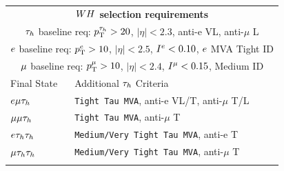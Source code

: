 \begin{table}[htbp]
\centering
\begin{small}
\begin{tabular}{ll}
     \multicolumn{2}{c}{ \textbf{$WH$ selection requirements} }                \\ 
     \multicolumn{2}{c}{$\tau_{h}$ baseline req: $p_\mathrm{T}^{\tau_{h}}>20$, $|\eta|<2.3$, anti-e VL, anti-$\mu$ L}    \\
     \multicolumn{2}{c}{$e$ baseline req: $p_\mathrm{T}^{e}>10$, $|\eta|<2.5$, $I^{e}<0.10$, $e$ MVA Tight ID}                 \\ 
     \multicolumn{2}{c}{$\mu$ baseline req: $p_\mathrm{T}^{\mu}>10$, $|\eta|<2.4$, $I^{\mu}<0.15$, Medium ID}          \\
\hline
  Final State            &      Additional $\tau_{h}$ Criteria  \\
\hline
 $e\mu\tau_{h}$      &   \texttt{Tight Tau MVA}, anti-e VL/T, anti-$\mu$ T/L             \\
 $\mu\mu\tau_{h}$     &   \texttt{Tight Tau MVA}, anti-$\mu$ T             \\
 $e\tau_{h}\tau_{h}$     &   \texttt{Medium/Very Tight Tau MVA}, anti-e T \\
 $\mu\tau_{h}\tau_{h}$    &   \texttt{Medium/Very Tight Tau MVA}, anti-$\mu$ T \\
\hline \\


\end{tabular}
\end{small}
\end{table}
